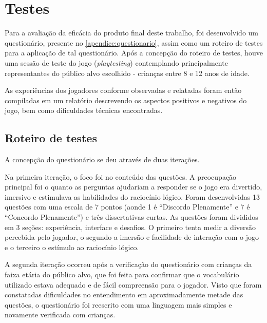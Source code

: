 
\chapter{Testes}\label{cap-testes}

Para a avaliação da eficácia do produto final deste trabalho, foi
desenvolvido um questionário, presente no \autoref{apendice:questionario}, 
assim como um roteiro de testes para a aplicação de tal 
questionário. Após a concepção do roteiro de testes, houve 
uma sessão de teste do jogo (\textit{playtesting}) contemplando 
principalmente representantes do público alvo escolhido - crianças 
entre 8 e 12 anos de idade.

As experiências dos jogadores conforme observadas e relatadas foram 
então compiladas em um relatório descrevendo os aspectos positivos e negativos 
do jogo, bem como dificuldades técnicas encontradas.

\section{Roteiro de testes}\label{sec-roteiro-testes}

A concepção do questionário se deu através de duas iterações.

Na primeira iteração, o foco foi no conteúdo das questões. A 
preocupação principal foi o quanto as perguntas ajudariam a 
responder se o jogo era divertido, imersivo e estimulava as 
habilidades do raciocínio lógico. Foram desenvolvidas 13 questões 
com uma escala de 7 pontos (aonde 1 é ``Discordo Plenamente'' e 7 
é ``Concordo Plenamente'') e três dissertativas curtas. As questões 
foram divididos em 3 seções: experiência, interface e desafios. 
O primeiro tenta medir a diversão percebida pelo jogador, o segundo 
a imersão e facilidade de interação com o jogo e o terceiro o 
estímulo ao raciocínio lógico.

A segunda iteração ocorreu após a verificação do questionário com 
crianças da faixa etária do público alvo, que foi feita para 
confirmar que o vocabulário utilizado estava adequado e de fácil 
compreensão para o jogador. Visto que foram constatadas 
dificuldades no entendimento em aproximadamente metade das 
questões, o questionário foi reescrito com uma linguagem mais 
simples e novamente verificada com crianças.

